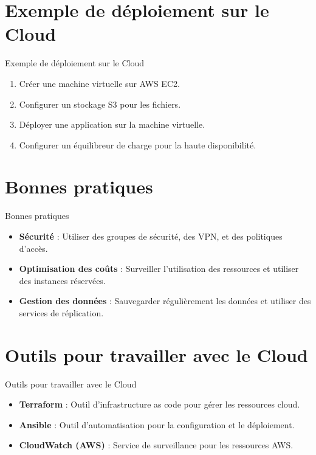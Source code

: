 \documentclass{clbeamer2024}
\begin{document}
\section{Exemple de déploiement sur le Cloud}
\begin{frame}{Exemple de déploiement sur le Cloud}
	\begin{enumerate}
		\item Créer une machine virtuelle sur AWS EC2.
		\item Configurer un stockage S3 pour les fichiers.
		\item Déployer une application sur la machine virtuelle.
		\item Configurer un équilibreur de charge pour la haute disponibilité.
	\end{enumerate}
\end{frame}


\section{Bonnes pratiques}
\begin{frame}{Bonnes pratiques}
	\begin{itemize}
		\item \textbf{Sécurité} : Utiliser des groupes de sécurité, des VPN, et des politiques d'accès.
		\item \textbf{Optimisation des coûts} : Surveiller l'utilisation des ressources et utiliser des instances réservées.
		\item \textbf{Gestion des données} : Sauvegarder régulièrement les données et utiliser des services de réplication.
	\end{itemize}
\end{frame}

\section{Outils pour travailler avec le Cloud}
\begin{frame}{Outils pour travailler avec le Cloud}
	\begin{itemize}
		\item \textbf{Terraform} : Outil d'infrastructure as code pour gérer les ressources cloud.
		\item \textbf{Ansible} : Outil d'automatisation pour la configuration et le déploiement.
		\item \textbf{CloudWatch (AWS)} : Service de surveillance pour les ressources AWS.
	\end{itemize}
\end{frame}
\end{document}
